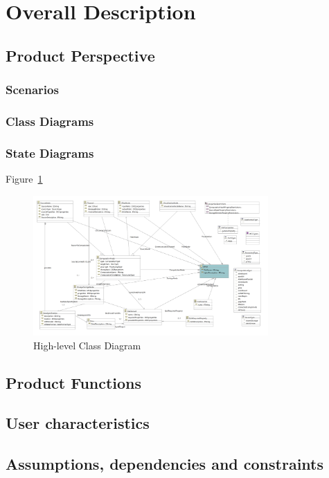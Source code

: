 \section{Overall Description}

\subsection{Product Perspective}

\subsubsection{Scenarios}
\subsubsection{Class Diagrams}
\subsubsection{State Diagrams}


Figure~\ref{fig:class-diagram} 
\begin{figure}[h!]
    \centering
    \includegraphics[width=0.8\textwidth]{Images/11.png}
    \caption{High-level Class Diagram}
    \label{fig:class-diagram}
\end{figure}

\subsection{Product Functions}

\subsection{User characteristics}

\subsection{Assumptions, dependencies and constraints}

